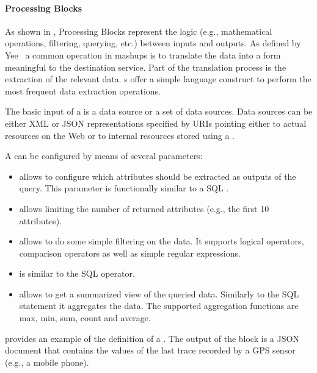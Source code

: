 \paragraph{Processing Blocks}
As shown in , Processing Blocks represent the logic (e.g., mathematical operations, filtering, querying, etc.) between inputs and outputs. As defined by Yee~\cite{Yee2008} a common operation in mashups is to translate the data into a form meaningful to the destination service. Part of the translation process is the extraction of the relevant data. s offer a simple language construct to perform the most frequent data extraction operations.

The basic input of a  is a data source or a set of data sources. Data sources can be either XML or JSON representations specified by URIs pointing either to actual resources on the Web or to internal resources stored using a .

A  can be configured by means of several parameters:
  \begin{itemize}
    \item {} allows to configure which attributes should be extracted as outputs of the query. This parameter is functionally similar to a SQL .
    \item {} allows limiting the number of returned attributes (e.g., the first 10 attributes).
    \item {} allows to do some simple filtering on the data. It supports logical operators, comparison operators as well as simple regular expressions.
    \item {} is similar to the SQL  operator.
    \item {} allows to get a summarized view of the queried data. Similarly to the SQL  statement it aggregates the data. The supported aggregation functions are max, min, sum, count and average.
  \end{itemize}

 provides an example of the definition of a . The output of the block is a JSON document that contains the values of the last trace recorded by a GPS sensor (e.g., a mobile phone).




